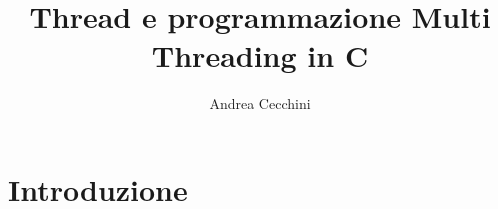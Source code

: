 \documentclass{article}
\title{Thread e programmazione Multi Threading in C}
\author{Andrea Cecchini}
\begin{document}
    \maketitle
    \section{Introduzione}
\end{document}
